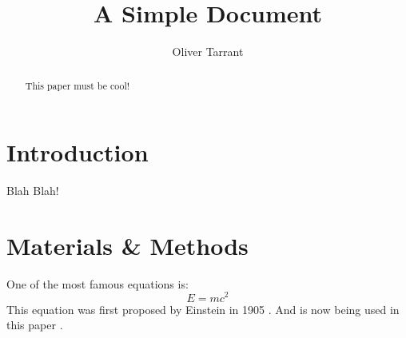 \documentclass[12pt]{article}
\title{A Simple Document}
\author{Oliver Tarrant}
\date{}
\begin{document}
	\maketitle
	
	\begin{abstract}
		This paper must be cool!
	\end{abstract}
	
	\section{Introduction}
		Blah Blah!
		
	\section{Materials \& Methods }
	One of the most famous equations is:
	\begin{equation}
		E = mc^2
	\end{equation}
	This equation was first proposed by Einstein in 1905
	\cite{einstein1905does}.
	And is now being used in this paper
	\cite{oliver2017test}.
	
	
	
\end{document}
